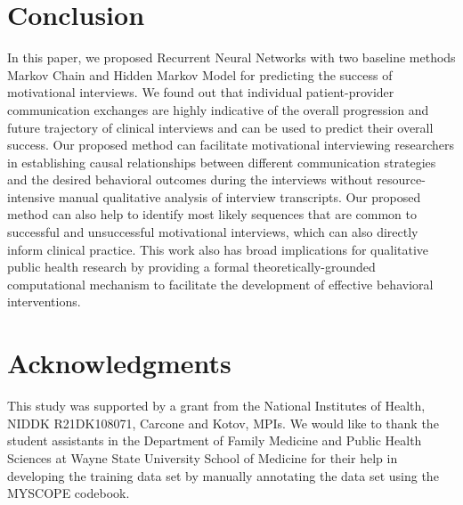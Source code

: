 \documentclass{amia_summit_2018}
\begin{document}
\section*{Conclusion}
In this paper, we proposed Recurrent Neural Networks with two baseline methods Markov Chain and Hidden Markov Model for predicting the success of motivational interviews. We found out that individual patient-provider communication exchanges are highly indicative of the overall progression and future trajectory of clinical interviews and can be used to predict their overall success. Our proposed method can facilitate motivational interviewing researchers in establishing causal relationships between different communication strategies and the desired behavioral outcomes during the interviews without resource-intensive manual qualitative analysis of interview transcripts. Our proposed method can also help to identify most likely sequences that are common to successful and unsuccessful motivational interviews, which can also directly inform clinical practice. This work also has broad implications for qualitative public health research by providing a formal theoretically-grounded computational mechanism to facilitate the development of effective behavioral interventions.

\section*{Acknowledgments}
This study was supported by a grant from the National Institutes of Health, NIDDK R21DK108071, Carcone and Kotov, MPIs. We would like to thank the student assistants in the Department of Family Medicine and Public Health Sciences at Wayne State University School of Medicine for their help in developing the training data set by manually annotating the data set using the MYSCOPE codebook. 



\end{document}
